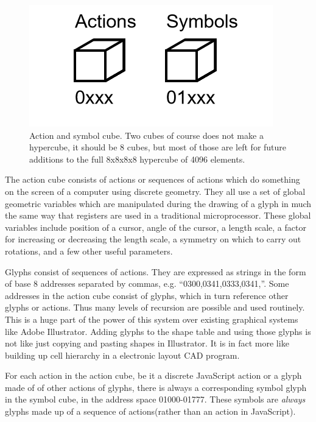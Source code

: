 \documentclass[11pt]{article}
\begin{document}
\begin{figure}

\includegraphics[width=\linewidth]{figures/figure1_cubes.png}

\caption{Action and symbol cube. Two cubes of course does not make a hypercube, it should be 8 cubes, but most of those are left for future additions to the full 8x8x8x8 hypercube of 4096 elements.}
\end{figure}




    The action cube consists of actions or sequences of actions which do something on the screen of a computer using discrete geometry.  They all use a set of global geometric variables which are manipulated during the drawing of a glyph in much the same way that registers are used in a traditional microprocessor.  These global variables include position of a cursor, angle of the cursor, a length scale, a factor for increasing or decreasing the length scale, a symmetry on which to carry out rotations, and a few other useful parameters.   





    Glyphs consist of sequences of actions.  They are expressed as strings in the form of base 8 addresses separated by commas, e.g. ``0300,0341,0333,0341,''.  Some addresses in the action cube consist of glyphs, which in turn reference other glyphs or actions.  Thus many levels of recursion are possible and used routinely.  This is a huge part of the power of this system over existing graphical systems like Adobe Illustrator.  Adding glyphs to the shape table and using those glyphs is not like just copying and pasting shapes in Illustrator.  It is in fact more like building up cell hierarchy in a electronic layout CAD program. 
    

    For each action in the action cube, be it a discrete JavaScript action or a glyph made of of other actions of glyphs, there is always a corresponding symbol glyph in the symbol cube, in the address space 01000-01777.  These symbols are \textit{
always} glyphs made up of a sequence of actions(rather than an action in JavaScript).  
\end{document}
